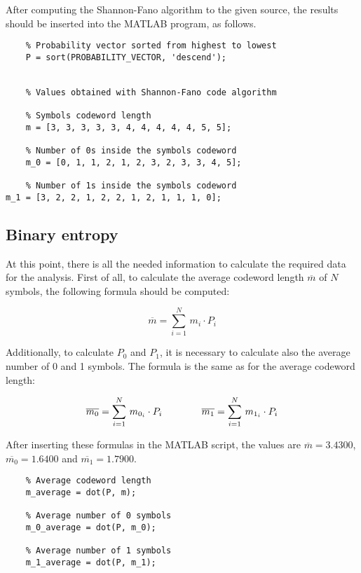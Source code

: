 \FloatBarrier \noindent After computing the Shannon-Fano algorithm to the given source, the results should be inserted into the MATLAB program, as follows.

\begin{lstlisting}
    % Probability vector sorted from highest to lowest
    P = sort(PROBABILITY_VECTOR, 'descend');


    % Values obtained with Shannon-Fano code algorithm

    % Symbols codeword length
    m = [3, 3, 3, 3, 3, 4, 4, 4, 4, 4, 5, 5]; 

    % Number of 0s inside the symbols codeword
    m_0 = [0, 1, 1, 2, 1, 2, 3, 2, 3, 3, 4, 5];

    % Number of 1s inside the symbols codeword
m_1 = [3, 2, 2, 1, 2, 2, 1, 2, 1, 1, 1, 0];
\end{lstlisting}


\subsection{Binary entropy}
At this point, there is all the needed information to calculate the required data for the analysis. First of all, to calculate the average codeword length $\overline{m}$ of $N$ symbols, the following formula should be computed:

\begin{equation*}
    \overline{m} = \sum_{i = 1}^N\,m_i \cdot P_i 
\end{equation*}

\noindent Additionally, to calculate $P_0$ and $P_1$, it is necessary to calculate also the average number of 0 and 1 symbols. The formula is the same as for the average codeword length:

\begin{equation*}
    \overline{m_0} = \sum_{i = 1}^N\,m_{0_i} \cdot P_i 
    \hspace*{40px}
    \overline{m_1} = \sum_{i = 1}^N\,m_{1_i} \cdot P_i
\end{equation*}

\noindent After inserting these formulas in the MATLAB script, the values are $\overline{m} = 3.4300$, $\overline{m_0} = 1.6400$ and $\overline{m_1} = 1.7900$.

\begin{lstlisting}
    % Average codeword length
    m_average = dot(P, m); 

    % Average number of 0 symbols
    m_0_average = dot(P, m_0);

    % Average number of 1 symbols
    m_1_average = dot(P, m_1);
\end{lstlisting}


